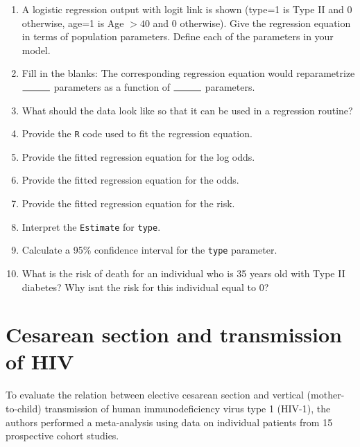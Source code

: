\documentclass[landscape,twocolumn,letterpaper,9pt,reqno]{article}\usepackage[]{graphicx}\usepackage[]{color}
\newcommand{\compresslist}{ %
	\setlength{\itemsep}{1pt}
	\setlength{\parskip}{0pt}
	\setlength{\parsep}{0pt}
}
\begin{document}
\begin{enumerate}\compresslist
	\item A logistic regression output with logit link is shown (type=1 is Type II and 0 otherwise, age=1 is Age $> 40$ and 0 otherwise). Give the regression equation in terms of population parameters. Define each of the parameters in your model.
	\item Fill in the blanks: The corresponding regression equation would reparametrize $\rule{1cm}{0.15mm}$ parameters as a function of $\rule{1cm}{0.15mm}$ parameters.
	\item What should the data look like so that it can be used in a regression routine? 
	\item Provide the \texttt{R} code used to fit the regression equation.
	\item Provide the fitted regression equation for the log odds. 
	\item Provide the fitted regression equation for the odds. 
	\item Provide the fitted regression equation for the risk. 
	\item Interpret the \texttt{Estimate} for \texttt{type}. 
	\item Calculate a 95\% confidence interval for the \texttt{type} parameter. 
	\item What is the risk of death for an individual who is 35 years old with Type II diabetes? Why isnt the risk for this individual equal to 0?
\end{enumerate}


\clearpage

\section{Cesarean section and transmission of HIV}

\vspace{-0.1in}

To evaluate the relation between elective cesarean section and vertical (mother-to-child) transmission of human immunodeficiency virus type 1 (HIV-1), the authors performed a meta-analysis using data on individual patients from 15 prospective cohort studies.
\end{document}
